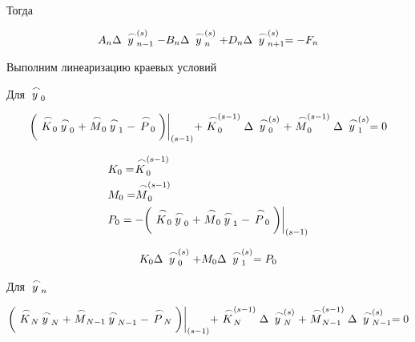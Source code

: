 \documentclass[a4paper, 14pt]{article}
\begin{document}
Тогда

\begin{equation*}
A_n\Delta\buildrel\,\,\frown\over{y}_{n-1}^{(s)}-B_n\Delta\buildrel\,\,\frown\over{y}_{n}^{(s)}+D_n\Delta\buildrel\,\,\frown\over{y}_{n+1}^{(s)}=-F_n
\end{equation*}

Выполним линеаризацию краевых условий

Для $\buildrel\,\,\frown\over{y}_0$

\begin{multline*}
\bigg( \buildrel\,\,\frown\over{K}_0 \buildrel\,\,\frown\over{y}_0+ \buildrel\,\,\frown\over{M}_0 \buildrel\,\,\frown\over{y}_1- \buildrel\,\,\frown\over{P}_0\bigg)\bigg|_{(s-1)}+\buildrel\,\,\frown\over{K}_0^{(s-1)}\Delta\buildrel\,\,\frown\over{y}_{0}^{(s)}+\buildrel\,\,\frown\over{M}_0^{(s-1)}\Delta\buildrel\,\,\frown\over{y}_{1}^{(s)}=0
\end{multline*}

\begin{equation*}
\begin{aligned}
&K_0=\buildrel\,\,\frown\over{K}_0^{(s-1)}\\
&M_0=\buildrel\,\,\frown\over{M}_0^{(s-1)}\\
&P_0=-\bigg( \buildrel\,\,\frown\over{K}_0 \buildrel\,\,\frown\over{y}_0+ \buildrel\,\,\frown\over{M}_0 \buildrel\,\,\frown\over{y}_1- \buildrel\,\,\frown\over{P}_0\bigg)\bigg|_{(s-1)}\\
\end{aligned}
\end{equation*}

\begin{equation*}
\begin{aligned}
&K_0\Delta\buildrel\,\,\frown\over{y}_{0}^{(s)}+M_0\Delta\buildrel\,\,\frown\over{y}_{1}^{(s)}=P_0\\
\end{aligned}
\end{equation*}

Для $\buildrel\,\,\frown\over{y}_n$

\begin{multline*}
\bigg( \buildrel\,\,\frown\over{K}_N \buildrel\,\,\frown\over{y}_N+ \buildrel\,\,\frown\over{M}_{N-1} \buildrel\,\,\frown\over{y}_{N-1}- \buildrel\,\,\frown\over{P}_N\bigg)\bigg|_{(s-1)}+\buildrel\,\,\frown\over{K}_N^{(s-1)}\Delta\buildrel\,\,\frown\over{y}_{N}^{(s)}+\buildrel\,\,\frown\over{M}_{N-1}^{(s-1)}\Delta\buildrel\,\,\frown\over{y}_{N-1}^{(s)}=0
\end{multline*}
\end{document}
